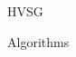 \documentclass[a4paper,10pt]{report}
\title{}
\author{}
\begin{document}
\maketitle
\tableofcontents


{HVSG}

{Algorithms}


\begin{thebibliography}{99.}
\end{thebibliography}
\end{document}
